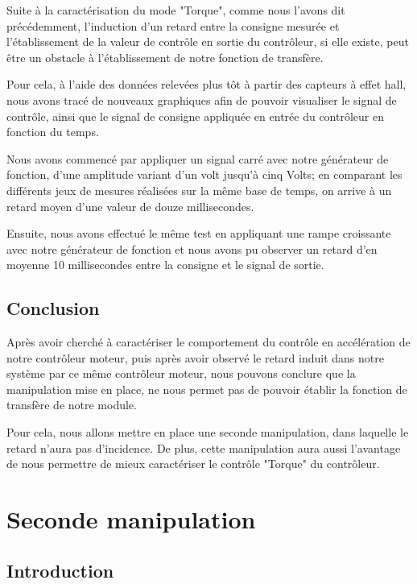 \documentclass[french,a4paper,12pt]{report}
\begin{document}
		Suite à la caractérisation du mode "Torque", comme nous l'avons dit précédemment, l'induction d'un retard entre la consigne mesurée et l'établissement de la valeur de contrôle en sortie du contrôleur, si elle existe, peut être un obstacle à l'établissement de notre fonction de transfère.
		
		Pour cela, à l'aide des données relevées plus tôt à partir des capteurs à effet hall, nous avons tracé de nouveaux graphiques afin de pouvoir visualiser le signal de contrôle, ainsi que le signal de consigne appliquée en entrée du contrôleur en fonction du temps.
		
		Nous avons commencé par appliquer un signal carré avec notre générateur de fonction, d'une amplitude variant d'un volt jusqu'à cinq Volts; en comparant les différents jeux de mesures réalisées sur la même base de temps, on arrive à un retard moyen d'une valeur de douze millisecondes.
		
		Ensuite, nous avons effectué le même test en appliquant une rampe croissante avec notre générateur de fonction et nous avons pu observer un retard d'en moyenne 10 millisecondes entre la consigne et le signal de sortie.
		
		\section{Conclusion}
		Après avoir cherché à caractériser le comportement du contrôle en accélération de notre contrôleur moteur, puis après avoir observé le retard induit dans notre système par ce même contrôleur moteur, nous pouvons conclure que la manipulation mise en place, ne nous permet pas de pouvoir établir la fonction de transfère de notre module.
		
		Pour cela, nous allons mettre en place une seconde manipulation, dans laquelle le retard n'aura pas d'incidence. De plus, cette manipulation aura aussi l'avantage de nous permettre de mieux caractériser le contrôle "Torque" du contrôleur.
		
		\newpage		
		
	\chapter{Seconde manipulation}
	
		\section{Introduction}
	
\end{document}

